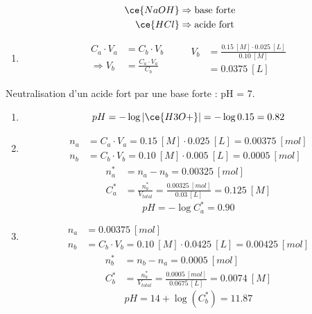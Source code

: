 \documentclass[
  11pt,
  a4paper,
  openany]{book}
\providecommand{\tightlist}{%
  \setlength{\itemsep}{0pt}\setlength{\parskip}{0pt}}
\begin{document}
\begin{Answer}

\[
\begin{split}
\ce{NaOH} &\Rightarrow \text{base forte} \\
\ce{HCl} &\Rightarrow \text{acide fort}
\end{split}
\]

\begin{enumerate}
\def\labelenumi{\alph{enumi}.}
\tightlist
\item
  \[
  \begin{split}
  C_a \cdot V_a &= C_b \cdot V_b \\
  \Rightarrow V_b &= \frac{C_a \cdot V_a}{C_b}
  \end{split}
  \qquad
  \begin{split}
  V_b &= \frac{0.15\ [M] \cdot 0.025\ [L]}{0.10\ [M]} \\
  &= 0.0375\ [L]
  \end{split}
  \]
\end{enumerate}

Neutralisation d'un acide fort par une base forte : pH = 7.

\begin{enumerate}
\def\labelenumi{\alph{enumi}.}
\setcounter{enumi}{1}
\item
  \[
  pH = - \log |\ce{H3O+}| = - \log 0.15 = 0.82
  \]
\item
  \[
  \begin{split}
  n_{a} &= C_{a} \cdot V_{a} = 0.15\ [M] \cdot 0.025\ [L] = 0.00375\ [mol] \\
  n_{b} &= C_{b} \cdot V_{b} = 0.10\ [M] \cdot 0.005\ [L] = 0.0005\ [mol]
  \end{split}
  \]
  \[
  \begin{split}
  n_{a}^* &= n_{a} - n_{b} = 0.00325\ [mol] \\
  C_{a}^* &= \frac{n_{a}^*}{V_{total}} = \frac{0.00325\ [mol]}{0.03\ [L]} = 0.125\ [M]
  \end{split}
  \]
  \[
  pH = - \log C_{a}^* = 0.90
  \]
\item
  \[
  \begin{split}
  n_{a} &= 0.00375\ [mol] \\
  n_{b} &= C_{b} \cdot V_{b} = 0.10\ [M] \cdot 0.0425\ [L] = 0.00425\ [mol]
  \end{split}
  \]
  \[
  \begin{split}
  n_{b}^* &= n_{b} - n_{a} = 0.0005\ [mol] \\
  C_{b}^* &= \frac{n_{b}^*}{V_{total}} = \frac{0.0005\ [mol]}{0.0675\ [L]} = 0.0074\ [M]
  \end{split}
  \]
  \[
  pH = 14 + \log(C_{b}^*) = 11.87
  \]
\end{enumerate}

\end{Answer}
\end{document}
